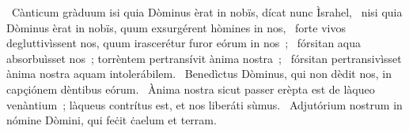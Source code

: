 {~Cànticum gràduum}
{%
isi quia Dòminus èrat in nobïs, dícat nunc Ìsrahel,
~nisi quia Dòminus èrat in nobïs, quum exsurgérent hòmines in nos,
~forte vivos degluttivìssent nos, quum irascerétur furor eórum in nos~;
~fórsitan aqua absorbuìsset nos~; torrèntem pertransívit ànima nostra~;
~fórsitan pertransivìsset ànima nostra aquam intolerábilem.
~Benedìctus Dòminus, qui non dèdit nos, in capçiónem dèntibus eórum.
~Ànima nostra sicut passer erèpta est de làqueo venàntium~; làqueus contrítus est, et nos liberáti sùmus.
~Adjutórium nostrum in nómine Dòmini, qui feċit ċaelum et terram.
}
